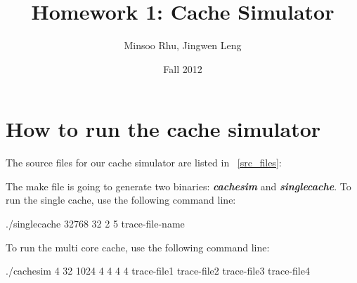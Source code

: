 \documentclass[12pt]{report}
\newcommand{\Tbl}[1]{\tablename~\ref{#1}}
\begin{document}

\title{Homework 1: Cache Simulator}
\author{Minsoo Rhu, Jingwen Leng}
\date{Fall 2012}
\maketitle

\section{How to run the cache simulator}

The source files for our cache simulator are listed in \Tbl{src_files}:

\begin{table}[h]
\centering  %
\caption{Source files in our cache simulator} %
\label{src_files} %
\end{table}

The make file is going to generate two binaries: \emph{\textbf{cachesim}} and \emph{\textbf{singlecache}}. To run the single cache, use the following command line:

./singlecache 32768 32 2 5 trace-file-name

To run the multi core cache, use the following command line:

./cachesim 4 32 1024 4 4 4 4 trace-file1 trace-file2 trace-file3 trace-file4
\end{document}
